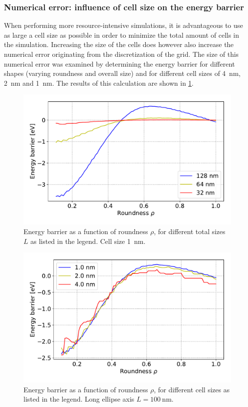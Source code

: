 \documentclass[12pt,a4paper]{article}
\begin{document}
\subsubsection{Numerical error: influence of cell size on the energy barrier}
When performing more resource-intensive simulations, it is advantageous to use as large a cell size as possible in order to minimize the total amount of cells in the simulation. Increasing the size of the cells does however also increase the numerical error originating from the discretization of the grid. The size of this numerical error was examined by determining the energy barrier for different shapes (varying roundness and overall size) and for different cell sizes of \SI{4}{\nano\metre}, \SI{2}{\nano\metre} and \SI{1}{\nano\metre}. The results of this calculation are shown in \cref{fig:barrier-cell_size}.
\begin{figure}
    \centering
    \includegraphics[width=0.9\columnwidth]{Figures/biaxial_island/Barrier/Plus_32-128_0.1-1_aPi4_B0.001_cell1nm.pdf}
    \caption{Energy barrier as a function of roundness $\rho$, for different total sizes $L$ as listed in the legend. Cell size \SI{1}{\nano\metre}.}
    \label{fig:barrier-cell_size}
\end{figure}
\begin{figure}
    \centering
    \includegraphics[width=0.9\columnwidth]{Figures/biaxial_island/Barrier/Plus_100_0.1-1_aPi4_B0.001.pdf}
    \caption{Energy barrier as a function of roundness $\rho$, for different cell sizes as listed in the legend. Long ellipse axis $L=\SI{100}{\nano\metre}$.}
    \label{fig:barrier-cell_size-100nm}
\end{figure}
\end{document}
